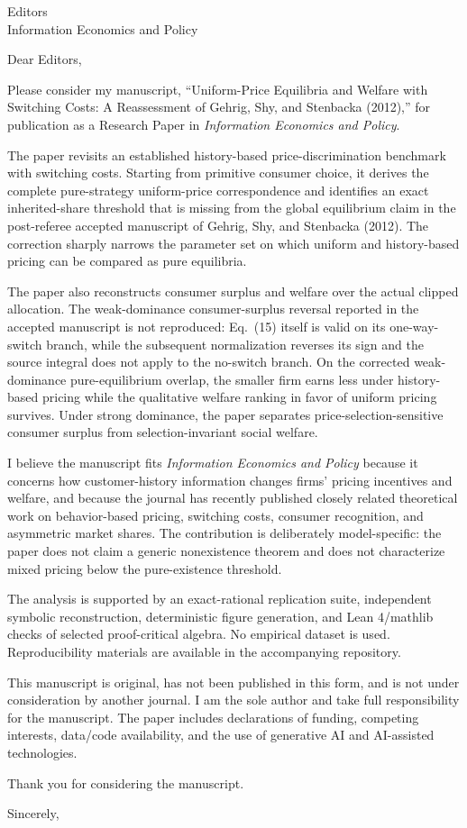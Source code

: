 \documentclass[10pt]{letter}
\date{September 23, 2026}
\begin{document}
\begin{letter}{Editors\\Information Economics and Policy}
\opening{Dear Editors,}

Please consider my manuscript, “Uniform-Price Equilibria and Welfare with Switching Costs: A Reassessment of Gehrig, Shy, and Stenbacka (2012),” for publication as a Research Paper in \emph{Information Economics and Policy}.

The paper revisits an established history-based price-discrimination benchmark with switching costs. Starting from primitive consumer choice, it derives the complete pure-strategy uniform-price correspondence and identifies an exact inherited-share threshold that is missing from the global equilibrium claim in the post-referee accepted manuscript of Gehrig, Shy, and Stenbacka (2012). The correction sharply narrows the parameter set on which uniform and history-based pricing can be compared as pure equilibria.

The paper also reconstructs consumer surplus and welfare over the actual clipped allocation. The weak-dominance consumer-surplus reversal reported in the accepted manuscript is not reproduced: Eq.~(15) itself is valid on its one-way-switch branch, while the subsequent normalization reverses its sign and the source integral does not apply to the no-switch branch. On the corrected weak-dominance pure-equilibrium overlap, the smaller firm earns less under history-based pricing while the qualitative welfare ranking in favor of uniform pricing survives. Under strong dominance, the paper separates price-selection-sensitive consumer surplus from selection-invariant social welfare.

I believe the manuscript fits \emph{Information Economics and Policy} because it concerns how customer-history information changes firms' pricing incentives and welfare, and because the journal has recently published closely related theoretical work on behavior-based pricing, switching costs, consumer recognition, and asymmetric market shares. The contribution is deliberately model-specific: the paper does not claim a generic nonexistence theorem and does not characterize mixed pricing below the pure-existence threshold.

The analysis is supported by an exact-rational replication suite, independent symbolic reconstruction, deterministic figure generation, and Lean 4/mathlib checks of selected proof-critical algebra. No empirical dataset is used. Reproducibility materials are available in the accompanying repository.

This manuscript is original, has not been published in this form, and is not under consideration by another journal. I am the sole author and take full responsibility for the manuscript. The paper includes declarations of funding, competing interests, data/code availability, and the use of generative AI and AI-assisted technologies.

Thank you for considering the manuscript.

\closing{Sincerely,}
\end{letter}
\end{document}
